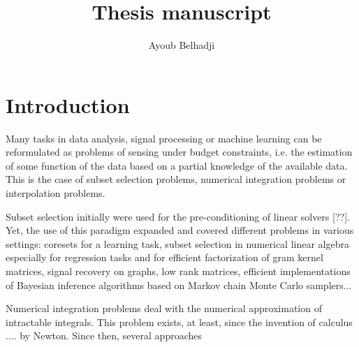 \documentclass[twoside,11pt]{book}
\begin{document}
\title{Thesis manuscript}


\author{Ayoub Belhadji} %
 
\maketitle






\newpage
\chapter{Introduction}
Many tasks in data analysis, signal processing or machine learning can be reformulated as problems of sensing under budget constraints, i.e. the estimation of some function of the data based on a partial knowledge of the available data. This is the case of subset selection problems, numerical integration problems or interpolation problems. 

Subset selection initially were used for the pre-conditioning of linear solvers [??]. Yet, the use of this paradigm expanded and covered different problems in various settings: coresets for a learning task, subset selection in numerical linear algebra especially for regression tasks and for efficient factorization of gram kernel matrices, signal recovery on graphs, low rank matrices, efficient implementations of Bayesian inference algorithms based on Markov chain Monte Carlo samplers...

Numerical integration problems deal with the numerical approximation of intractable integrals. This problem exists, at least, since the invention of calculus .... by Newton. Since then, several approaches
\end{document}
